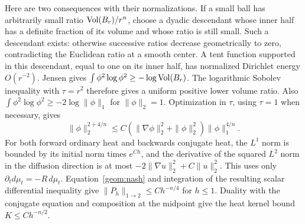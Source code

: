 Here are two consequences with their normalizations. If a small ball
has arbitrarily small ratio $\operatorname{Vol}(B_r)/r^n$, choose a dyadic descendant
whose inner half has a definite fraction of its volume and whose ratio
is still small. Such a descendant exists: otherwise successive ratios
decrease geometrically to zero, contradicting the Euclidean ratio at a
smooth center. A tent function supported in this descendant, equal to
one on its inner half, has normalized Dirichlet energy $O(r^{-2})$.
Jensen gives $\int\phi^2\log\phi^2\geq-\log\operatorname{Vol}(B_r)$.
The logarithmic Sobolev inequality with $\tau=r^2$ therefore gives a
uniform positive lower volume ratio. Also
$\int\phi^2\log\phi^2\geq-2\log\|\phi\|_1$ for
$\|\phi\|_2=1$. Optimization in $\tau$, using $\tau=1$ when
necessary, gives
\begin{equation}\label{geom:nash}
 \|\phi\|_2^{2+4/n}
 \leq C(\|\nabla\phi\|_2^2+\|\phi\|_2^2)\|\phi\|_1^{4/n}.
\end{equation}
For both forward ordinary heat and backwards conjugate heat, the
$L^1$ norm is bounded by its initial norm times $e^{Ch}$, and the
derivative of the squared $L^2$ norm in the diffusion direction is at
most $-2\|\nabla u\|_2^2+C\|u\|_2^2$. This uses only
$\partial_t d\mu_t=-R\,d\mu_t$. Equation~\eqref{geom:nash} and
integration of the resulting scalar differential inequality give
$\|P_h\|_{1\to2}\leq Ch^{-n/4}$ for $h\leq1$. Duality with the
conjugate equation and composition at the midpoint give the heat
kernel bound $K\leq Ch^{-n/2}$.

